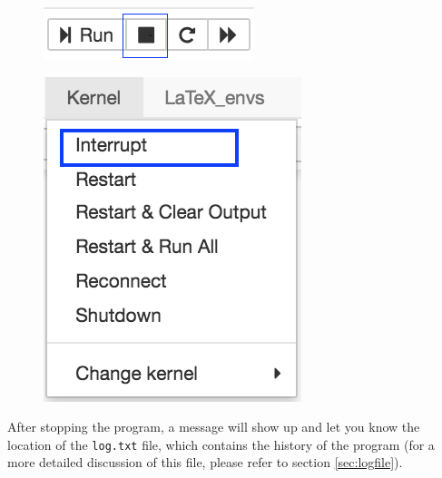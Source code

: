 \documentclass[12pt]{article}
\begin{document}
\begin{figure}[H]
\centering
\begin{minipage}{.5\textwidth}
  \centering
\includegraphics[scale=0.6]{buttonStop}
  \label{fig:buttonStop}
\end{minipage}%
\begin{minipage}{.5\textwidth}
  \centering
\includegraphics[scale=0.5]{menuInterrupt}
  \label{fig:interruptKernel}
\end{minipage}
\end{figure}

After stopping the program, a message will show up and let you know the location of the \texttt{log.txt} file, which contains the history of the program (for a more detailed discussion of this file, please refer to section \ref{sec:logfile}).
\end{document}
